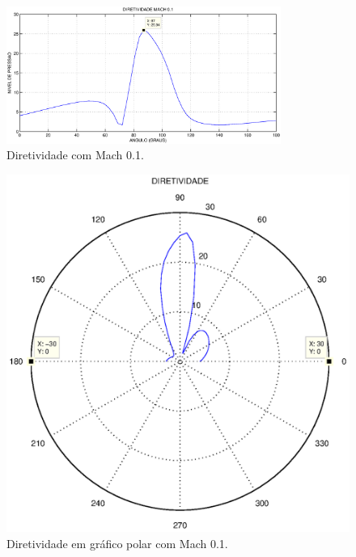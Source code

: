 \begin{figure}[h!]
    \centering
    \hspace{-1.cm}
    \includegraphics[width=0.8\textwidth]{Mach_0.1/diretividade.eps}
    \caption{Diretividade com Mach 0.1.}
\end{figure}

\begin{figure}[h!]
    \centering
    \hspace{-1.cm}
    \includegraphics[width=1.1\textwidth]{Mach_0.1/diretividade_polar.eps}
    \caption{Diretividade em gráfico polar com Mach 0.1.}
\end{figure}

